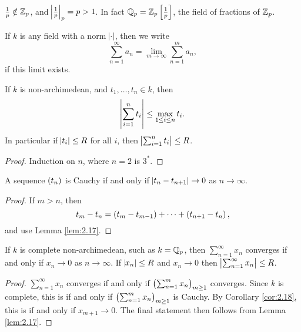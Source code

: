 \begin{note*}
$ \tfrac{1}{p} \notin \mathbb{Z}_p $, and $ \abs{\tfrac{1}{p}}_p = p > 1 $. In fact $ \QQ_p = \ZZ_p\sbr{\tfrac{1}{p}} $, the field of fractions of $ \mathbb{Z}_p $.
\end{note*}

\begin{definition}
If $ k $ is any field with a norm $ \abs{\cdot} $, then we write
$$ \sum_{n = 1}^\infty a_n = \lim_{m \to \infty} \sum_{n = 1}^m a_n, $$
if this limit exists.
\end{definition}

\begin{lemma}
\label{lem:2.17}
If $ k $ is non-archimedean, and $ t_1, \dots, t_n \in k $, then
$$ \abs{\sum_{i = 1}^n t_i} \le \max_{1 \le i \le n} t_i. $$
In particular if $ \abs{t_i} \le R $ for all $ i $, then $ \abs{\sum_{i = 1}^n t_i} \le R $.
\end{lemma}

\begin{proof}
Induction on $ n $, where $ n = 2 $ is $ 3^* $.
\end{proof}

\begin{corollary}
\label{cor:2.18}
A sequence $ \br{t_n} $ is Cauchy if and only if $ \abs{t_n - t_{n + 1}} \to 0 $ as $ n \to \infty $.
\end{corollary}

\begin{proof}
If $ m > n $, then
$$ t_m - t_n = \br{t_m - t_{m - 1}} + \dots + \br{t_{n + 1} - t_n}, $$
and use Lemma \ref{lem:2.17}.
\end{proof}

\pagebreak

\begin{lemma}
If $ k $ is complete non-archimedean, such as $ k = \mathbb{Q}_p $, then $ \sum_{n = 1}^\infty x_n $ converges if and only if $ x_n \to 0 $ as $ n \to \infty $. If $ \abs{x_n} \le R $ and $ x_n \to 0 $ then $ \abs{\sum_{n = 1}^\infty x_n} \le R $.
\end{lemma}

\begin{proof}
$ \sum_{n = 1}^\infty x_n $ converges if and only if $ \br{\sum_{n = 1}^m x_n}_{m \ge 1} $ converges. Since $ k $ is complete, this is if and only if $ \br{\sum_{n = 1}^m x_n}_{m \ge 1} $ is Cauchy. By Corollary \ref{cor:2.18}, this is if and only if $ x_{m + 1} \to 0 $. The final statement then follows from Lemma \ref{lem:2.17}.
\end{proof}

